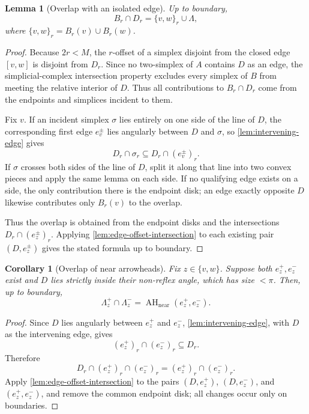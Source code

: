 \documentclass[11pt]{article}
\newtheorem{lemma}[theorem]{Lemma}
\newtheorem{corollary}[theorem]{Corollary}
\newcommand{\AHnear}{\operatorname{AH}_{\mathrm{near}}}
\numberwithin{equation}{section}
\begin{document}
\begin{lemma}[Overlap with an isolated edge]\label{lem:isolated-edge-overlap}
Up to boundary,
\[
\boxed{
B_r\cap D_r
=
\{v,w\}_r\cup\Lambda,
}
\]
where $\{v,w\}_r=B_r(v)\cup B_r(w)$.
\end{lemma}

\begin{proof}
Because $2r<M$, the $r$-offset of a simplex disjoint from the closed edge $[v,w]$ is disjoint from $D_r$. Since no two-simplex of $A$ contains $D$ as an edge, the simplicial-complex intersection property excludes every simplex of $B$ from meeting the relative interior of $D$. Thus all contributions to $B_r\cap D_r$ come from the endpoints and simplices incident to them.

Fix $v$. If an incident simplex $\sigma$ lies entirely on one side of the line of $D$, the corresponding first edge $e_v^\pm$ lies angularly between $D$ and $\sigma$, so \cref{lem:intervening-edge} gives
\[
D_r\cap\sigma_r\subseteq D_r\cap(e_v^\pm)_r.
\]
If $\sigma$ crosses both sides of the line of $D$, split it along that line into two convex pieces and apply the same lemma on each side. If no qualifying edge exists on a side, the only contribution there is the endpoint disk; an edge exactly opposite $D$ likewise contributes only $B_r(v)$ to the overlap.

Thus the overlap is obtained from the endpoint disks and the intersections $D_r\cap(e_z^\pm)_r$. Applying \cref{lem:edge-offset-intersection} to each existing pair $(D,e_z^\pm)$ gives the stated formula up to boundary.
\end{proof}

\begin{corollary}[Overlap of near arrowheads]\label{cor:near-overlap}
Fix $z\in\{v,w\}$. Suppose both $e_z^+,e_z^-$ exist and $D$ lies strictly inside their non-reflex angle, which has size $<\pi$. Then, up to boundary,
\[
\boxed{
\Lambda_z^+\cap\Lambda_z^-
=
\AHnear(e_z^+,e_z^-).
}
\]
\end{corollary}

\begin{proof}
Since $D$ lies angularly between $e_z^+$ and $e_z^-$, \cref{lem:intervening-edge}, with $D$ as the intervening edge, gives
\[
(e_z^+)_r\cap(e_z^-)_r\subseteq D_r.
\]
Therefore
\[
D_r\cap(e_z^+)_r\cap(e_z^-)_r
=(e_z^+)_r\cap(e_z^-)_r.
\]
Apply \cref{lem:edge-offset-intersection} to the pairs $(D,e_z^+)$, $(D,e_z^-)$, and $(e_z^+,e_z^-)$, and remove the common endpoint disk; all changes occur only on boundaries.
\end{proof}
\end{document}
